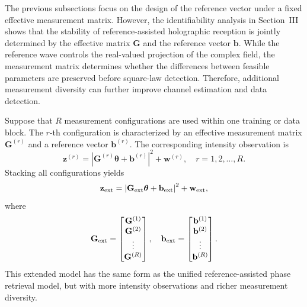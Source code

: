 \documentclass[journal]{IEEEtran}
\begin{document}
The previous subsections focus on the design of the reference vector under a fixed effective measurement matrix. 
However, the identifiability analysis in Section~III shows that the stability of reference-assisted holographic reception is jointly determined by the effective matrix $\mathbf{G}$ and the reference vector $\mathbf{b}$. 
While the reference wave controls the real-valued projection of the complex field, the measurement matrix determines whether the differences between feasible parameters are preserved before square-law detection. 
Therefore, additional measurement diversity can further improve channel estimation and data detection.

Suppose that $R$ measurement configurations are used within one training or data block. 
The $r$-th configuration is characterized by an effective measurement matrix $\mathbf{G}^{(r)}$ and a reference vector $\mathbf{b}^{(r)}$. 
The corresponding intensity observation is
\begin{equation}
\mathbf{z}^{(r)}
=
\left|
\mathbf{G}^{(r)}\boldsymbol{\theta}
+
\mathbf{b}^{(r)}
\right|^2
+
\mathbf{w}^{(r)},
\quad
r=1,2,\ldots,R.
\label{eq:multi_config_observation}
\end{equation}
Stacking all configurations yields
\begin{equation}
\mathbf{z}_{\rm ext}
=
\left|
\mathbf{G}_{\rm ext}\boldsymbol{\theta}
+
\mathbf{b}_{\rm ext}
\right|^2
+
\mathbf{w}_{\rm ext},
\label{eq:extended_measurement_model}
\end{equation}
where
\begin{equation}
\mathbf{G}_{\rm ext}
=
\begin{bmatrix}
\mathbf{G}^{(1)}\\
\mathbf{G}^{(2)}\\
\vdots\\
\mathbf{G}^{(R)}
\end{bmatrix},
\quad
\mathbf{b}_{\rm ext}
=
\begin{bmatrix}
\mathbf{b}^{(1)}\\
\mathbf{b}^{(2)}\\
\vdots\\
\mathbf{b}^{(R)}
\end{bmatrix}.
\label{eq:extended_G_b}
\end{equation}
This extended model has the same form as the unified reference-assisted phase retrieval model, but with more intensity observations and richer measurement diversity.
\end{document}
